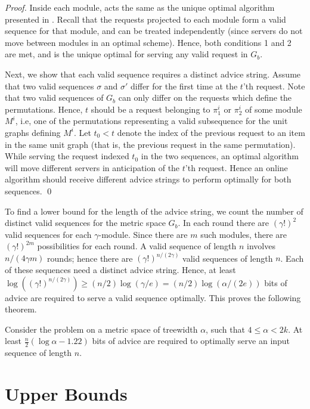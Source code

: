 \begin{proof}
Inside each module, \sol acts the same as the unique optimal algorithm presented in \cite{Bock11}. Recall that the requests projected to each module form a valid sequence for that module, and can be treated independently (since servers do not move between modules in an optimal scheme). Hence, both conditions 1 and 2 are met, and \sol is the unique optimal for 
serving any valid request in $G_b$. 

Next, we show that each valid sequence requires a distinct advice string. Assume that two valid sequences $\sigma$ and $\sigma'$ differ for the first time at the $t$'th request. Note that two valid sequences of $G_b$ can only differ on the requests which define the permutations. Hence, $t$ should be a request belonging to $\pi^i_1$ or $\pi^i_2$ of some module $M^i$, i.e, one of the permutations representing a valid subsequence for the unit graphs defining $M^i$. Let $t_{0}<t$ denote the index of the previous request to an item in the same unit graph (that is, the previous request in the same permutation). While serving the request indexed $t_{0}$ in the two sequences,  an optimal algorithm will move different servers in anticipation of the $t$'th request. Hence an online algorithm should receive different advice strings to perform optimally for both sequences. \qed 
\end{proof}

To find a lower bound for the length of the advice string, we count the number of distinct valid sequences for the metric space $G_b$.
In each round there are $(\gamma !)^2$ valid sequences for each $\gamma$-module. Since there are $m$ such modules, there are $(\gamma !) ^ {2m}$ possibilities for each round. A valid sequence of length $n$ involves $n/(4\gamma m)$ rounds; hence there are $(\gamma !)^ {n/(2\gamma)}$ valid sequences of length $n$. Each of these sequences need a distinct advice string. Hence, at least $\log ((\gamma !)^{n/(2 \gamma)}) \geq (n/2) \log (\gamma /e) =   (n/2) \log (\alpha / (2e))$ bits of advice are required to serve a valid sequence optimally. This proves the following theorem.

\begin{theorem}\label{mainLowTreeWidth}
Consider the \ks problem on a metric space of treewidth $\alpha$, such that $4 \leq \alpha < 2k$. At least $\frac{n}{2}(\log \alpha- 1.22)$ bits of advice are required to optimally serve an input sequence of length $n$.
\end{theorem}
\section{Upper Bounds}

